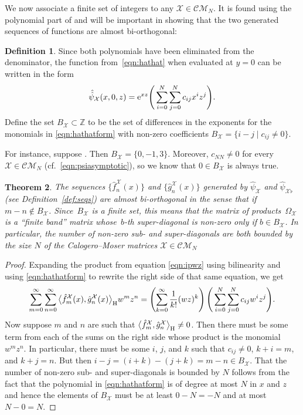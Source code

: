 \documentclass[pdftex]{sigma}
\numberwithin{equation}{section}
\newtheorem{Theorem}{Theorem}[section]
\theoremstyle{definition}
\newtheorem{Definition}[Theorem]{Definition}
\def\X{\mathcal{X}}
\def\CM{\mathcal{C\!M}}
\def\ff{\hat f}
\def\gg{\hat g}
\begin{document}
We now associate a finite set of integers to any $\X\in\CM_{N}$. It
is found using the polynomial part of
\smash{$\hat{\hat\psi}_{\X}(x,0,z)$} and will be important in showing that the two
generated sequences of functions are almost bi-orthogonal:
\begin{Definition}\label{def:BX}
Since both polynomials have been eliminated from the denominator, the
function \smash{$\hat{\hat\psi}_{\X}$} from~\eqref{eqn:hathat} when evaluated at $y=0$ can be
written in the form
\begin{equation}
 \hat{\hat\psi}_{\X}(x,0,z)=
{\rm e}^{xz}\Bigg(\sum_{i=0}^N\sum_{j=0}^N c_{ij}x^iz^j\Bigg).\label{eqn:hathatform}
\end{equation}
 Define the set $B_{\X}\subset\mathbb{Z}$ to be the set of
 differences in the exponents for the monomials in
 \eqref{eqn:hathatform} with non-zero coefficients
$ B_{\X}=\{i-j\mid c_{ij}\not=0\}$.
\end{Definition}

For instance, suppose
\smash{$\hat{\hat\psi}_{\X}(x,0,z)={\rm e}^{xz}\bigl(1+xz^2+x^3\bigr)$}. Then
$B_{\X}=\{0,-1,3\}$. Moreover, $c_{NN}\not=0$ for every $\X\in\CM_N$
(cf.\ \eqref{eqn:psiasymptotic}), so we know that $0\in B_{\X}$
is always true.

\begin{Theorem}\label{thm:almostbiorthog}
The sequences $\big\{\ff_n^{\X}(x)\big\}$ and $\big\{\gg_n^{\X}(x)\big\}$ generated by
$\hat\psi_{\X}$ and $\hat\psi_{\X\flat}$
{\rm(}see Definition~{\rm\ref{def:seqs})} are almost bi-orthogonal in the sense that
\smash{$\big\langle \ff_m^{\X},\gg_n^{\X}\big\rangle_{\rm H}=0$} if $m-n\not\in B_{\X}$. Since~$B_{\X}$ is
a finite set, this means that the matrix of products~$\Omega_{\X}$ is a ``finite band'' matrix whose~$b$\nobreakdash-th super-diagonal is non-zero only if $b\in B_{\X}$. In
particular, the number of non-zero sub- and super-diagonals are both
bounded by the size $N$ of the Calogero--Moser matrices $\X\in\CM_N$
\end{Theorem}
\begin{proof}
Expanding the product from equation \eqref{eqn:ipwz} using bilinearity
and using \eqref{eqn:hathatform} to rewrite the right side of that
same equation, we get
\[
\sum_{m=0}^{\infty}\sum_{n=0}^{\infty}\big\langle
\ff_m^{\X}(x), \gg_n^{\X}(x)\big\rangle_{\rm H} w^mz^n
=
\left(\sum_{k=0}^{\infty}\frac{1}{k!}(wz)^k\right)\Bigg(\sum_{i=0}^N\sum_{j=0}^N c_{ij}w^iz^j\Bigg).
\]
Now suppose $m$ and $n$ are such that $\big\langle
\ff_m^{\X},\gg_n^{\X}\big\rangle_{\rm H}\not=0$. Then there must be some term from
each of the sums on the right side whose product is the monomial
$w^mz^n$. In particular, there must be some $i$, $j$, and $k$ such
that $c_{ij}\not=0$, $k+i=m$, and $k+j=n$. But then
$i-j=(i+k)-(j+k)=m-n\in B_{\X}$.
That the number of non-zero sub- and super-diagonals is bounded by $N$
follows from the fact that the polynomial in \eqref{eqn:hathatform} is
of degree at most $N$ in $x$ and $z$ and hence the elements of
$B_{\X}$ must be at least $0-N=-N$ and at most $N-0=N$.
 \end{proof}
\end{document}
